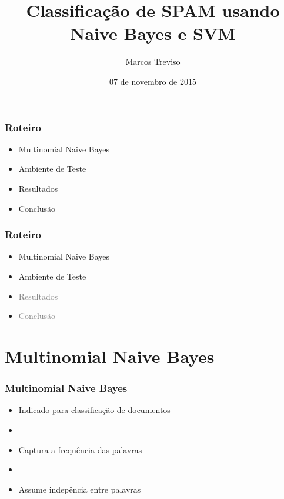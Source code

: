 \documentclass[10pt]{beamer}
\title{Classificação de SPAM usando Naive Bayes e SVM}
\subtitle{}
\date{07 de novembro de 2015}
\author[Treviso]{Marcos Treviso}
\institute{Aprendizado de Máquina - Universidade Federal do Pampa}
\begin{document}
\maketitle


\begin{frame}
  \frametitle{Roteiro}

  \begin{itemize}

    \item Multinomial Naive Bayes
    
    \item Ambiente de Teste

    \item Resultados

    \item Conclusão

  \end{itemize}

\end{frame}



\begin{frame}
  \frametitle{Roteiro}

  \begin{itemize}

    \item Multinomial Naive Bayes

    \item[\color{gray}{$\bullet$}] Ambiente de Teste

    \item[\color{gray}{$\bullet$}] \textcolor{gray}{Resultados}

    \item[\color{gray}{$\bullet$}] \textcolor{gray}{Conclusão}

  \end{itemize}

\end{frame}




\section{Multinomial Naive Bayes}

\begin{frame}[fragile]
  \frametitle{Multinomial Naive Bayes}

 \begin{itemize}

      \item Indicado para classificação de documentos

      \item[\ ] \ 

      \item Captura a frequência das palavras

      \item[\ ] \ 

      \item Assume indepência entre palavras
  \end{itemize}

  
\end{frame}
\end{document}
